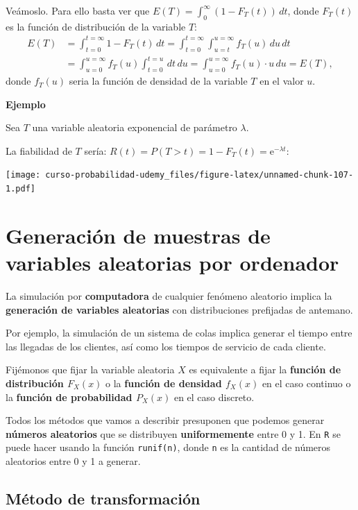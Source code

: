 \documentclass[]{book}
\begin{document}
Veámoslo. Para ello basta ver que \(E(T)=\int_0^\infty (1-F_T(t))\, dt\), donde \(F_T(t)\) es la función de distribución de la variable \(T\):
\[
\begin{array}{rl}
E(T) & =\displaystyle\int_{t=0}^{t=\infty} 1-F_T(t)\, dt=\int_{t=0}^{t=\infty}\int_{u=t}^{u=\infty} f_T(u)\,du\,dt \\[1ex] & =\displaystyle\int_{u=0}^{u=\infty} f_T(u)\int_{t=0}^{t=u} \, dt\, du =\int_{u=0}^{u=\infty} f_T(u)\cdot u\, du = E(T),
\end{array}
\]
donde \(f_T(u)\) seria la función de densidad de la variable \(T\) en el valor \(u\).

\textbf{Ejemplo}

Sea \(T\) una variable aleatoria exponencial de parámetro \(\lambda\).

La fiabilidad de \(T\) sería: \(R(t)=P(T>t)=1-F_T(t)=\mathrm{e}^{-\lambda t}\):

\texttt{[image: curso-probabilidad-udemy\_files/figure-latex/unnamed-chunk-107-1.pdf]}

\hypertarget{generaciuxf3n-de-muestras-de-variables-aleatorias-por-ordenador}{%
\section{Generación de muestras de variables aleatorias por ordenador}\label{generaciuxf3n-de-muestras-de-variables-aleatorias-por-ordenador}}

La simulación por \textbf{computadora} de cualquier fenómeno aleatorio implica la \textbf{generación de variables aleatorias} con distribuciones prefijadas de antemano.

Por ejemplo, la simulación de un sistema de colas implica generar el tiempo entre las llegadas de los clientes, así como los tiempos de servicio de cada cliente.

Fijémonos que fijar la variable aleatoria \(X\) es equivalente a fijar la \textbf{función de distribución \(F_X(x)\)} o la \textbf{función de densidad \(f_X(x)\)} en el caso continuo o la \textbf{función de probabilidad \(P_X(x)\)} en el caso discreto.

Todos los métodos que vamos a describir presuponen que podemos generar \textbf{números aleatorios} que se distribuyen \textbf{uniformemente} entre 0 y 1. En \texttt{R} se puede hacer usando la función \texttt{runif(n)}, donde \texttt{n} es la cantidad de números aleatorios entre 0 y 1 a generar.

\hypertarget{muxe9todo-de-transformaciuxf3n}{%
\subsection{Método de transformación}\label{muxe9todo-de-transformaciuxf3n}}
\end{document}
